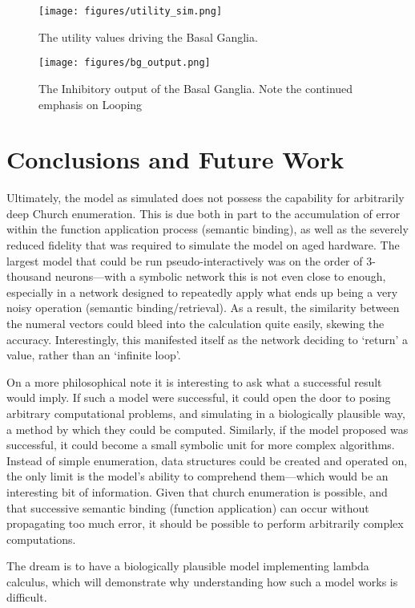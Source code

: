 \documentclass{report}
\begin{document}
\begin{figure}[H]
\centering
\texttt{[image: figures/utility\_sim.png]}
\caption{The utility values driving the Basal Ganglia.}
\label{fig:utility_sim}
\end{figure}

\begin{figure}[H]
\centering
\texttt{[image: figures/bg\_output.png]}
\caption{The Inhibitory output of the Basal Ganglia. Note the continued emphasis on Looping}
\label{fig:bg_output}
\end{figure}


\chapter{Conclusions and Future Work}
Ultimately, the model as simulated does not possess the capability for arbitrarily deep Church enumeration.
This is due both in part to the accumulation of error within the function application process (semantic binding), as well as the severely reduced fidelity that was required to simulate the model on aged hardware.
The largest model that could be run pseudo-interactively was on the order of 3-thousand neurons---with a symbolic network this is not even close to enough, especially in a network designed to repeatedly apply what ends up being a very noisy operation (semantic binding/retrieval).
As a result, the similarity between the numeral vectors could bleed into the calculation quite easily, skewing the accuracy.
Interestingly, this manifested itself as the network deciding to \lq{}return\rq{} a value, rather than an \lq{}infinite loop\rq{}.

On a more philosophical note it is interesting to ask what a successful result would imply.
If such a model were successful, it could open the door to posing arbitrary computational problems, and simulating in a biologically plausible way, a method by which they could be computed.
Similarly, if the model proposed was successful, it could become a small symbolic unit for more complex algorithms.
Instead of simple enumeration, data structures could be created and operated on, the only limit is the model\rq{}s ability to comprehend them---which would be an interesting bit of information.
Given that church enumeration is possible, and that successive semantic binding (function application) can occur without propagating too much error, it should be possible to perform arbitrarily complex computations.

The dream is to have a biologically plausible model implementing lambda calculus, which will demonstrate why understanding how such a model works is difficult.
\end{document}
